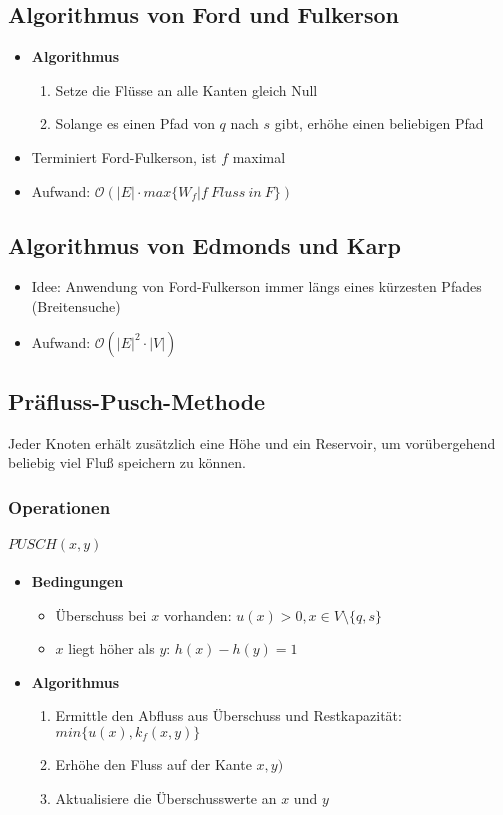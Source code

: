 \subsection{Algorithmus von Ford und Fulkerson}
\begin{itemize}
	\item \textbf{Algorithmus}
	\begin{enumerate}
		\item Setze die Flüsse an alle Kanten gleich Null
		\item Solange es einen Pfad von \(q\) nach \(s\) gibt, erhöhe einen beliebigen Pfad
	\end{enumerate}
	\item Terminiert Ford-Fulkerson, ist \(f\) maximal
	\item Aufwand: \(\mathcal{O}(|E| \cdot max\{W_f | f~Fluss~in~F\})\)
\end{itemize}


\subsection{Algorithmus von Edmonds und Karp}
\begin{itemize}
	\item Idee: Anwendung von Ford-Fulkerson immer längs eines kürzesten Pfades (Breitensuche)
	\item Aufwand: \(\mathcal{O} (|E|^2 \cdot |V|)\)
\end{itemize}


\subsection{Präfluss-Pusch-Methode}
Jeder Knoten erhält zusätzlich eine Höhe und ein Reservoir, um vorübergehend beliebig viel Fluß speichern zu können.

\subsubsection{Operationen}

\paragraph{\(PUSCH(x,y)\)}
\begin{itemize}
	\item \textbf{Bedingungen}
	\begin{itemize}
		\item Überschuss bei \(x\) vorhanden: \(u(x) > 0, x \in V \setminus \{q,s\}\)
		\item \(x\) liegt höher als \(y\): \(h(x) - h(y) = 1\)
	\end{itemize}
	\item \textbf{Algorithmus}
	\begin{enumerate}
		\item Ermittle den Abfluss aus Überschuss und Restkapazität: \(min\{u(x), k_f(x,y)\}\)
		\item Erhöhe den Fluss auf der Kante \(x,y)\)
		\item Aktualisiere die Überschusswerte an \(x\) und \(y\)
	\end{enumerate}
\end{itemize}

